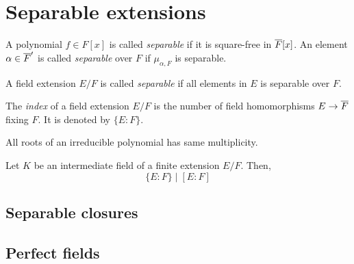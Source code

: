 \documentclass{../exp}
\begin{document}
\section{Separable extensions}



\begin{defn}
A polynomial $f\in F[x]$ is called \emph{separable} if it is square-free in $\overline F[x]$.
An element $\alpha\in\overline F'$ is called \emph{separable} over $F$ if $\mu_{\alpha,F}$ is separable.
\end{defn}

\begin{defn}
A field extension $E/F$ is called \emph{separable} if all elements in $E$ is separable over $F$.
\end{defn}




\begin{defn}
The \emph{index} of a field extension $E/F$ is the number of field homomorphisms $E\to\cl F$ fixing $F$.
It is denoted by $\{E:F\}$.
\end{defn}

\begin{prop}
All roots of an irreducible polynomial has same multiplicity.
\end{prop}
\begin{pf}
\end{pf}

\begin{thm}
Let $K$ be an intermediate field of a finite extension $E/F$.
Then,
\[\{E:F\}\mid[E:F]\]
\end{thm}
\begin{pf}
\end{pf}





\subsection{Separable closures}





\subsection{Perfect fields}
\end{document}
